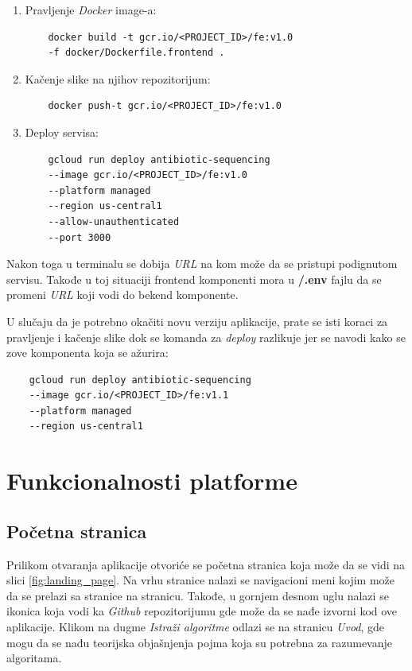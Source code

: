 \documentclass[12pt,oneside]{memoir}
\begin{document}
\begin{enumerate}
\item Pravljenje \emph{Docker} image-a:
\begin{verbatim}
    docker build -t gcr.io/<PROJECT_ID>/fe:v1.0 
    -f docker/Dockerfile.frontend .
\end{verbatim}
\item Kačenje slike na njihov repozitorijum:
\begin{verbatim}
    docker push-t gcr.io/<PROJECT_ID>/fe:v1.0
\end{verbatim}
\item Deploy servisa: 
\begin{verbatim}
    gcloud run deploy antibiotic-sequencing 
    --image gcr.io/<PROJECT_ID>/fe:v1.0 
    --platform managed 
    --region us-central1
    --allow-unauthenticated 
    --port 3000
\end{verbatim}
\end{enumerate}

Nakon toga u terminalu se dobija \emph{URL} na kom može da se pristupi podignutom servisu. Takođe u toj situaciji frontend komponenti mora u \textbf{/.env} fajlu da se promeni \emph{URL} koji vodi do bekend komponente.

U slučaju da je potrebno okačiti novu verziju aplikacije, prate se isti koraci za pravljenje i kačenje slike dok se komanda za \emph{deploy} razlikuje jer se navodi kako se zove komponenta koja se ažurira:
\begin{verbatim}
    gcloud run deploy antibiotic-sequencing 
    --image gcr.io/<PROJECT_ID>/fe:v1.1 
    --platform managed 
    --region us-central1
\end{verbatim}

\section{Funkcionalnosti platforme}

\subsection{Početna stranica}

Prilikom otvaranja aplikacije otvoriće se početna stranica koja može da se vidi na slici \ref{fig:landing_page}. Na vrhu stranice nalazi se navigacioni meni kojim može da se prelazi sa stranice na stranicu. Takođe, u gornjem desnom uglu nalazi se ikonica koja vodi ka \emph{Github} repozitorijumu gde može da se nađe izvorni kod ove aplikacije.
Klikom na dugme \emph{Istraži algoritme} odlazi se na stranicu \emph{Uvod}, gde mogu da se nađu teorijska objašnjenja pojma koja su potrebna za razumevanje algoritama.
\end{document}
